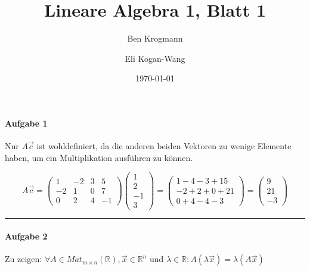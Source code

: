 \documentclass[a4paper,12pt]{article}
\title{Lineare Algebra 1, Blatt 1}
\author{
    Ben Krogmann
    \and
    Eli Kogan-Wang
}
\date{\today}
\begin{document}
\maketitle
\thispagestyle{fancy}

\paragraph{Aufgabe 1}
Nur $A\vec c$ ist wohldefiniert, da die anderen beiden Vektoren zu wenige Elemente haben, um ein Multiplikation ausführen zu können.

\[
    A\vec c=\begin{pmatrix}
        1  & -2 & 3 & 5  \\
        -2 & 1  & 0 & 7  \\
        0  & 2  & 4 & -1
    \end{pmatrix}\begin{pmatrix}
        1 \\2\\-1\\3
    \end{pmatrix}=\begin{pmatrix}
        1-4-3+15  \\
        -2+2+0+21 \\
        0+4-4-3
    \end{pmatrix}=\begin{pmatrix}
        9 \\21\\-3
    \end{pmatrix}
\]

\noindent\rule{\textwidth}{0.4pt}

\paragraph{Aufgabe 2} Zu zeigen:
$\forall A\in Mat_{m\times n}(\mathbb R),\vec x\in\mathbb R^n\text{ und }\lambda\in\mathbb R:A(\lambda\vec x)=\lambda(A\vec x)$
\end{document}
